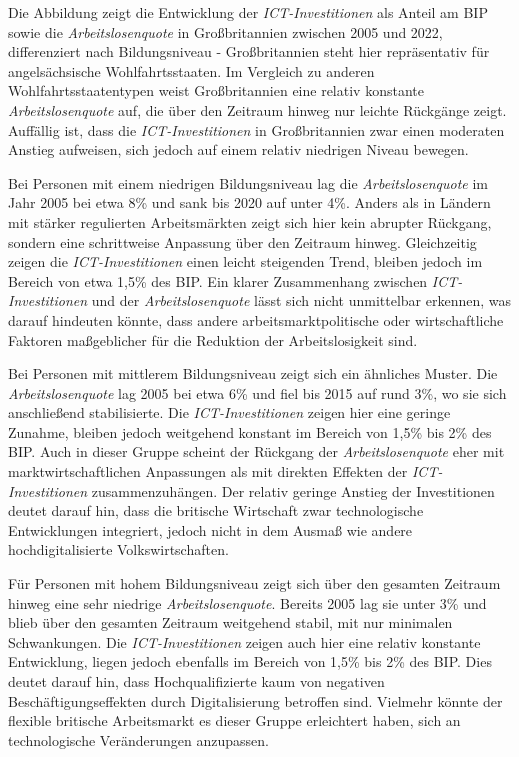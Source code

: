 Die Abbildung zeigt die Entwicklung der \textit{\ac{ICT}-Investitionen} als Anteil am 
BIP sowie die \textit{Arbeitslosenquote} in Großbritannien zwischen 2005 und 2022, 
differenziert nach Bildungsniveau - Großbritannien steht hier repräsentativ für 
angelsächsische Wohlfahrtsstaaten. Im Vergleich zu anderen Wohlfahrtsstaatentypen weist 
Großbritannien eine relativ konstante \textit{Arbeitslosenquote} auf, die über den Zeitraum 
hinweg nur leichte Rückgänge zeigt. Auffällig ist, dass die \textit{\ac{ICT}-Investitionen} 
in Großbritannien zwar einen moderaten Anstieg aufweisen, sich jedoch auf einem relativ 
niedrigen Niveau bewegen.

Bei Personen mit einem niedrigen Bildungsniveau lag die \textit{Arbeitslosenquote} im 
Jahr 2005 bei etwa 8\% und sank bis 2020 auf unter 4\%. Anders als in Ländern mit stärker 
regulierten Arbeitsmärkten zeigt sich hier kein abrupter Rückgang, sondern eine 
schrittweise Anpassung über den Zeitraum hinweg. Gleichzeitig zeigen die 
\textit{\ac{ICT}-Investitionen} einen leicht steigenden Trend, bleiben jedoch im Bereich 
von etwa 1,5\% des BIP. Ein klarer Zusammenhang zwischen \textit{\ac{ICT}-Investitionen} 
und der \textit{Arbeitslosenquote} lässt sich nicht unmittelbar erkennen, was darauf 
hindeuten könnte, dass andere arbeitsmarktpolitische oder wirtschaftliche Faktoren 
maßgeblicher für die Reduktion der Arbeitslosigkeit sind.

Bei Personen mit mittlerem Bildungsniveau zeigt sich ein ähnliches Muster. Die 
\textit{Arbeitslosenquote} lag 2005 bei etwa 6\% und fiel bis 2015 auf rund 3\%, wo sie 
sich anschließend stabilisierte. Die \textit{\ac{ICT}-Investitionen} zeigen hier eine 
geringe Zunahme, bleiben jedoch weitgehend konstant im Bereich von 1,5\% bis 2\% des BIP. 
Auch in dieser Gruppe scheint der Rückgang der \textit{Arbeitslosenquote} eher mit 
marktwirtschaftlichen Anpassungen als mit direkten Effekten der 
\textit{\ac{ICT}-Investitionen} zusammenzuhängen. Der relativ geringe Anstieg der 
Investitionen deutet darauf hin, dass die britische Wirtschaft zwar technologische 
Entwicklungen integriert, jedoch nicht in dem Ausmaß wie andere hochdigitalisierte 
Volkswirtschaften.

Für Personen mit hohem Bildungsniveau zeigt sich über den gesamten Zeitraum hinweg eine 
sehr niedrige \textit{Arbeitslosenquote}. Bereits 2005 lag sie unter 3\% und blieb über 
den gesamten Zeitraum weitgehend stabil, mit nur minimalen Schwankungen. Die 
\textit{\ac{ICT}-Investitionen} zeigen auch hier eine relativ konstante Entwicklung, 
liegen jedoch ebenfalls im Bereich von 1,5\% bis 2\% des BIP. Dies deutet darauf hin, 
dass Hochqualifizierte kaum von negativen Beschäftigungseffekten durch Digitalisierung 
betroffen sind. Vielmehr könnte der flexible britische Arbeitsmarkt es dieser Gruppe 
erleichtert haben, sich an technologische Veränderungen anzupassen.

